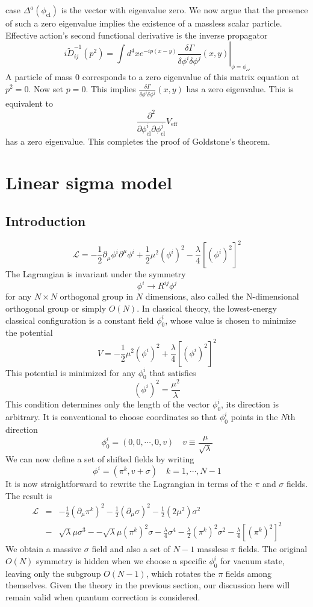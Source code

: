\begin{newproof}
case $\Delta^a(\phi_{\mathrm{cl}})$ is the vector with eigenvalue zero.
We now argue that the presence of such a zero eigenvalue implies the existence of a massless scalar particle. Effective action's second functional derivative is the inverse propagator
\[i\tilde{D}_{ij}^{-1}(p^2) = \int d^4x e^{-ip(x-y)} \left. \frac{\delta \Gamma}{\delta \phi^i \delta \phi^j}(x,y) \right|_{\phi = \phi_{\mathcal{cl}}}\]
A particle of mass $0$ corresponds to a zero eigenvalue of this matrix equation at $p^2 = 0$. Now set $p=0$. This implies $\frac{\delta \Gamma}{\delta \phi^i \delta \phi^j}(x,y)$ has a zero eigenvalue. This is equivalent to 
\[\frac{\partial^2}{\partial \phi^i_{\mathrm{cl}} \partial \phi^j_{\mathrm{cl}}}V_{\mathrm{eff}}\]
has a zero eigenvalue. This completes the proof of Goldstone's theorem.
\end{newproof}

\section{Linear sigma model}
\subsection{Introduction}
\[\mathcal{L} = -\frac{1}{2} \partial_{\mu} \phi^i \partial^{\mu}\phi^i + \frac{1}{2} \mu^2 (\phi^i)^2 - \frac{\lambda}{4} [(\phi^i)^2]^2\]
The Lagrangian is invariant under the symmetry
\[\phi^i \to R^{ij} \phi^j\]
for any $N \times N$ orthogonal group in $N$ dimensions, also called the N-dimensional orthogonal group or simply $O(N)$. In classical theory, the lowest-energy classical configuration is a constant field $\phi_0^i$, whose value is chosen to minimize the potential
\[V = -\frac{1}{2}\mu^2 (\phi^i)^2 + \frac{\lambda}{4}[(\phi^i)^2]^2\]
This potential is minimized for any $\phi_0^i$ that satisfies
\[(\phi^i)^2 = \frac{\mu^2}{\lambda} \]
This condition determines only the length of the vector $\phi_0^i$, its direction is arbitrary. 
It is conventional to choose coordinates so that $\phi_0^i$ points in the $N$th direction
\[\phi_0^i = (0,0,\cdots,0,v) \quad v \equiv \frac{\mu}{\sqrt{\lambda}}\]
We can now define a set of shifted fields by writing
\[\phi^i = (\pi^k,v+\sigma) \quad k = 1,\cdots,N-1\]
It is now straightforward to rewrite the Lagrangian in terms of the $\pi$ and $\sigma$ fields. The result is
\begin{eqnarray}
\mathcal{L} &=& -\frac{1}{2}(\partial_{\mu}\pi^k)^2 - \frac{1}{2}(\partial_{\mu}\sigma)^2 - \frac{1}{2}(2\mu^2)\sigma^2 \nonumber \\
&-& \sqrt{\lambda}\mu \sigma^3 - -\sqrt{\lambda}\mu (\pi^k)^2\sigma - \frac{\lambda}{4}\sigma^4 - \frac{\lambda}{2}(\pi^k)^2\sigma^2 - \frac{\lambda}{4}[(\pi^k)^2]^2 \nonumber
\end{eqnarray}
We obtain a massive $\sigma$ field and also a set of $N-1$ massless $\pi$ fields. The original $O(N)$ symmetry is hidden when we choose a specific $\phi_0^i$ for vacuum state, leaving only the subgroup $O(N-1)$, which rotates the $\pi$ fields among themselves. Given the theory in the previous section, our discussion here will remain valid when quantum correction is considered.

